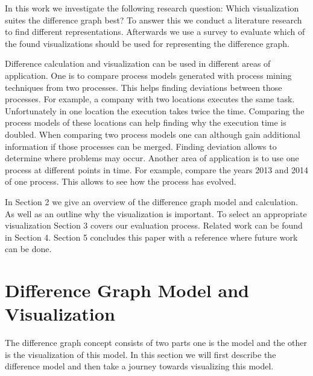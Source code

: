 \documentclass{llncs}
\begin{document}
In this work we investigate the following research question: Which visualization suites the difference graph best? To answer this we conduct a literature research to find different representations. Afterwards we use a survey to evaluate which of the found visualizations should be used for representing the difference graph.

Difference calculation and visualization can be used in different areas of application. One is to compare process models generated with process mining techniques from two processes. This helps finding deviations between those processes. For example, a company with two locations executes the same task. Unfortunately in one location the execution takes twice the time. Comparing the process models of these locations can help finding why the execution time is doubled. When comparing two process models one can although gain additional information if those processes can be merged. Finding deviation allows to determine where problems may occur. Another area of application is to use one process at different points in time. For example, compare the years 2013 and 2014 of one process. This allows to see how the process has evolved.

In Section 2 we give an overview of the difference graph model and calculation. As well as an outline why the visualization is important. To select an appropriate visualization Section 3 covers our evaluation process. Related work can be found in Section 4. Section 5 concludes this paper with a reference where future work can be done.





\section{Difference Graph Model and Visualization} %
\label{sec:DiffgraphModel}
The difference graph concept \cite{lit:VisuApprDiffAnalysis} consists of two parts one is the model and the other is the visualization of this model. In this section we will  first describe the difference model and then take a journey towards visualizing this model.
\end{document}

